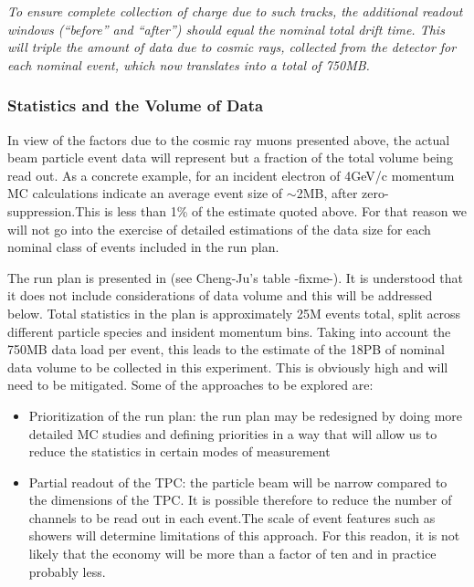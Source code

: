 \textit{To ensure complete collection of charge due to such tracks, the additional readout windows (``before'' and ``after'') 
should equal the nominal total drift time. This will triple the amount of
data due to cosmic rays, collected from the detector for each nominal event, which now translates into a total of 750MB.}


\subsubsection{Statistics and the Volume of Data}
\label{bin_table}

In view of the factors due to the cosmic ray muons presented above, the actual beam particle event data will represent but a fraction of
the total volume being read out.  As a concrete example, for an incident
electron of 4GeV/c momentum MC calculations indicate an average event size of $\sim$2MB, after zero-suppression.This is less than 1\%
of the estimate quoted above. For that reason we will not go into the exercise of detailed estimations of the data size for each nominal class
of events included in the run plan.

The run plan is presented in (see Cheng-Ju's table -fixme-). It is understood that it does not include considerations of data volume
and this will be addressed below. Total statistics in the plan is approximately 25M events total, split across different particle species
and insident momentum bins. Taking into account the 750MB data load per event, this leads to the estimate of the 18PB of nominal
data volume to be collected in this experiment. This is obviously high and will need to be mitigated. Some of the approaches to be
explored are:
\begin{itemize}
\item Prioritization of the run plan: the run plan may be redesigned by doing more detailed MC studies and defining priorities in a way that
will allow us to reduce the statistics in certain modes of measurement
\item Partial readout of the TPC: the particle beam will be narrow compared to the dimensions of the TPC. It is possible therefore to reduce the
number of channels to be read out in each event.The scale of event features such as showers will determine limitations of this approach. For this readon,
it is not likely that the economy will be more than a factor of ten and in practice probably less.
\end{itemize}




